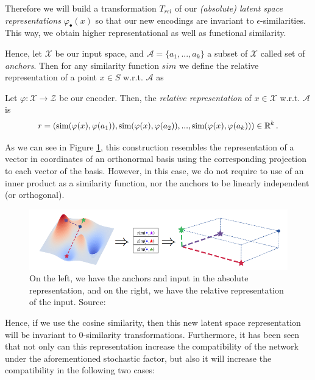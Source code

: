 \documentclass[../main.tex]{subfiles}
\begin{document}
Therefore we will build a transformation $T_{rel}$ of our \emph{(absolute) latent space representations} $\varphi_\bullet(x)$ so that our new encodings are invariant to $\epsilon$-similarities. This way, we obtain higher representational as well as functional similarity.

Hence, let $\mathcal{X}$ be our input space, and $\mathcal{A}= \{a_1, ..., a_k\}$ a subset of $\mathcal{X}$ called set of \emph{anchors}. Then for any similarity function $sim$ we define the relative representation of a point $x\in S$  w.r.t. $\mathcal{A}$ as

\begin{definition}
Let $\varphi:\mathcal{X} \to \mathcal{Z}$ be our encoder. Then, the \emph{relative representation} of $x \in \mathcal{X}$ w.r.t. $\mathcal{A}$ is
\[
r = (\text{sim}(\varphi(x), \varphi(a_1)), \text{sim}(\varphi(x), \varphi(a_2)), ..., \text{sim}(\varphi(x), \varphi(a_k))) \in \mathbb{R}^k\,.
\]
\end{definition}


\begin{remark}
As we can see in Figure \ref{fig:relativeSche}, this construction resembles the representation of a vector in coordinates of an orthonormal basis using the corresponding projection to each vector of the basis. However, in this case, we do not require to use of an inner product as a similarity function, nor the anchors to be linearly independent (or orthogonal).
\end{remark}

\begin{figure}[!ht]
    \centering
    \includegraphics[width=\textwidth]{figures/bg/relativeSche.png} 
    \caption{On the left, we have the anchors and input in the absolute representation, and on the right, we have the relative representation of the input. Source: \cite{moschella_relative_2022}}
    \label{fig:relativeSche}
\end{figure}

Hence, if we use the cosine similarity, then this new latent space representation will be invariant to $0$-similarity transformations. Furthermore, it has been seen that not only can this representation increase the compatibility of the network under the aforementioned stochastic factor, but also it will increase the compatibility in the following two cases:
\end{document}
